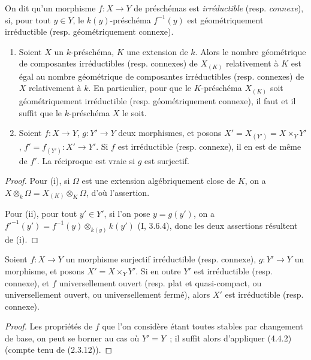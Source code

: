 \begin{definition}[4.5.5]
\label{IV.2.4.5.5-fr}
On dit qu'un morphisme $f:X\to Y$ de préschémas est \emph{irréductible}
(resp. \emph{connexe}), si, pour tout $y\in Y$, le $k(y)$-préschéma
$f^{-1}(y)$ est géométriquement irréductible (resp. géométriquement connexe).
\end{definition}

\begin{proposition}[4.5.6]
\label{IV.2.4.5.6-fr}
\begin{enumerate}
\item[(i)] Soient $X$ un $k$-préschéma, $K$ une extension de $k$. Alors le
nombre géométrique de composantes irréductibles (resp. connexes) de $X_{(K)}$
relativement à $K$ est égal au nombre géométrique de composantes irréductibles
(resp. connexes) de $X$ relativement à $k$. En particulier, pour que le
$K$-préschéma $X_{(K)}$ soit géométriquement irréductible (resp.
géométriquement connexe), il faut et il suffit que le $k$-préschéma $X$ le
soit.
\item[(ii)] Soient $f:X\to Y$, $g:Y'\to Y$ deux morphismes, et posons
$X'=X_{(Y')}=X\times_Y Y'$, $f'=f_{(Y')}:X'\to Y'$. Si $f$ est irréductible
(resp. connexe), il en est de même de $f'$. La réciproque est vraie si $g$ est
surjectif.
\end{enumerate}
\end{proposition}

\begin{proof}
Pour (i), si $\Omega$ est une extension algébriquement close de $K$, on a
$X\otimes_k\Omega=X_{(K)}\otimes_K\Omega$, d'où l'assertion.

Pour (ii), pour tout $y'\in Y'$, si l'on pose $y=g(y')$, on a
$f'^{-1}(y')=f^{-1}(y)\otimes_{k(y)}k(y')$ (I, 3.6.4), donc les deux assertions
résultent de (i).
\end{proof}

\begin{proposition}[4.5.7]
\label{IV.2.4.5.7-fr}
Soient $f:X\to Y$ un morphisme surjectif irréductible (resp. connexe),
$g:Y'\to Y$ un morphisme, et posons $X'=X\times_Y Y'$. Si en outre $Y'$ est
irréductible (resp. connexe), et $f$ universellement ouvert (resp. plat et
quasi-compact, ou universellement ouvert, ou universellement fermé), alors
$X'$ est irréductible (resp. connexe).
\end{proposition}

\begin{proof}
Les propriétés de $f$ que l'on considère étant toutes stables par changement
de base, on peut se borner au cas où $Y'=Y$~; il suffit alors d'appliquer
(4.4.2) (compte tenu de (2.3.12)).
\end{proof}

